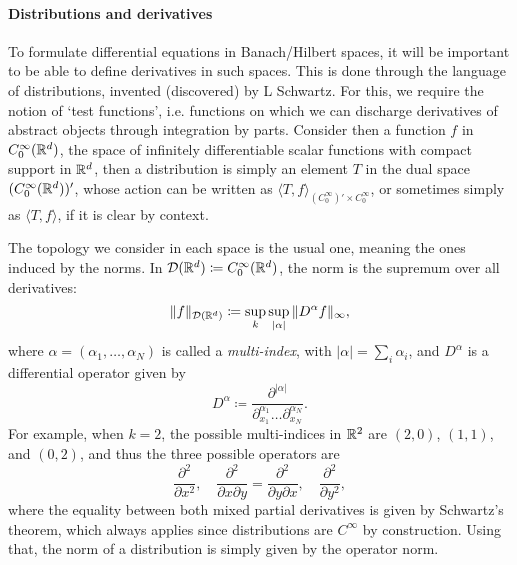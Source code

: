 \paragraph{Distributions and derivatives} 
{\color{blue}
To formulate differential equations in Banach/Hilbert spaces, it will be important to be able to define derivatives in such spaces. This is done through the language of distributions, invented (discovered) by L Schwartz. For this, we require the notion of `test functions', i.e. functions on which we can discharge derivatives of abstract objects through integration by parts. Consider then a function $f$ in $C_0^\infty(\mathbb{R}^d)$, the space of infinitely differentiable scalar functions with compact support in $\mathbb{R}^d$, then a distribution is simply an element $T$ in the dual space $(C_0^\infty(\mathbb{R}^d))'$, whose action can be written as $\langle T, f\rangle_{(C_0^\infty)'\times C_0^\infty}$, or sometimes simply as $\langle T, f\rangle$, if it is clear by context. 

The topology we consider in each space is the usual one, meaning the ones induced by the norms. In $\mathcal D(\mathbb{R}^d)\coloneqq C_0^\infty(\mathbb{R}^d)$, the norm is the supremum over all derivatives:
\begin{equation} %
    \| f \|_{\mathcal D(\R^d)} \coloneqq \sup_{k} \sup_{|\alpha|} \|D^\alpha f\|_\infty,
\end{equation}
where $\alpha=(\alpha_1, \hdots, \alpha_N)$ is called a \emph{multi-index}, with $|\alpha| = \sum_i \alpha_i$, and $D^\alpha$ is a differential operator given by 
\begin{equation}
    D^\alpha \coloneqq \frac{\partial^{|\alpha|}}{\partial^{\alpha_1}_{x_1}\hdots \partial^{\alpha_N}_{x_N}}.
\end{equation}
For example, when $k=2$, the possible multi-indices in $\mathbb{R}^2$ are $(2,0)$, $(1,1)$, and $(0,2)$, and thus the three possible operators are
\begin{equation*}
    \frac{\partial^2}{\partial x^2},\quad  \frac{\partial^2}{\partial x\partial y} = \frac{\partial^2}{\partial y\partial x},\quad \frac{\partial^2}{\partial y^2},
\end{equation*}
where the equality between both mixed partial derivatives is given by Schwartz's theorem, which always applies since distributions are $C^\infty$ by construction. 
Using that, the norm of a distribution is simply given by the operator norm. }

